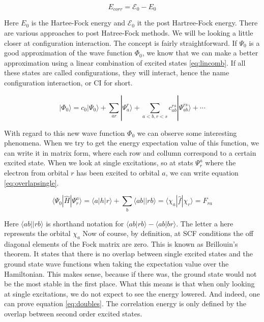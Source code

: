 \documentclass[twoside,twocolumn,9pt]{article}
\begin{document}
\begin{equation}\label{eq:Ecorr}
  E_{corr} = \mathcal{E}_0 - E_0
\end{equation}

Here $E_0$ is the Hartee-Fock energy and $\mathcal{E}_0$ it the post Hartree-Fock energy. There are various approaches to post Hatree-Fock methods. We will be looking a little closer
at configuration interaction. The concept is fairly straightforward. If $\Psi_0$ is a good approximation of the wave function $\Phi_0$, we know that we can make a better approximation
using a linear combination of excited states \eqref{eq:lincomb}\cite{Szabo1996}. If all these states are called configurations, they will interact, hence the name configuration
interaction, or CI for short.

\begin{equation}\label{eq:lincomb}
  |\Phi_0\rangle = c_0|\Psi_0\rangle + \sum_{ar}|\Psi_a^r\rangle + \sum_{a<b,r<s}c_{ab}^{rs}|\Psi^{rs}_{ab} \rangle + \cdots
\end{equation}

With regard to this new wave function $\Phi_0$ we can observe some interesting phenomena. When we try to get the energy expectation value of this function, we can write it in matrix
form, where each row and collumn correspond to a certain excited state. When we look at single excitations, so at stats $\Psi_r^a$ where the electron from orbital $r$ has been
excited to orbital $a$, we can write equation \eqref{eq:overlapsingle}\cite{Szabo1996}.

\begin{equation}\label{eq:overlapsingle}
  \langle\Psi_0 |\hat{H}|\Psi_r^a\rangle = \langle a|h|r \rangle + \sum_b \langle ab||rb \rangle = \langle \chi_a |\hat{f}| \chi_r \rangle = F_{ra}
\end{equation}

Here $\langle ab||rb \rangle$ is shorthand notation for $\langle ab | rb \rangle - \langle ab | br \rangle$. The letter a here represents the orbital $\chi_a$
Now of course, by definition, at SCF conditions the off diagonal elements of the Fock matrix are zero. This is known as Brillouin's theorem. It states that there is no overlap
between single excited states and the ground state wave functions when taking the expectation value over the Hamiltonian. This makes sense, because if there was, the ground state
would not be the most stable in the first place. What this means is that when only looking at single excitations, we do not expect to see the energy lowered. And indeed, one can
prove equation \eqref{eq:doubles}\cite{Szabo1996}. The correlation energy is only defined by the overlap between second order excited states.
\end{document}
